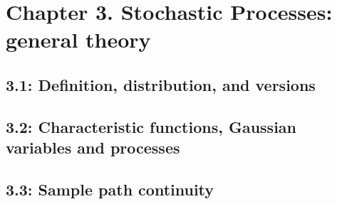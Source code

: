 \section*{Chapter 3. Stochastic Processes: general theory}
\subsection*{3.1: Definition, distribution, and versions}
\subsection*{3.2: Characteristic functions, Gaussian variables and processes}
\subsection*{3.3: Sample path continuity}

